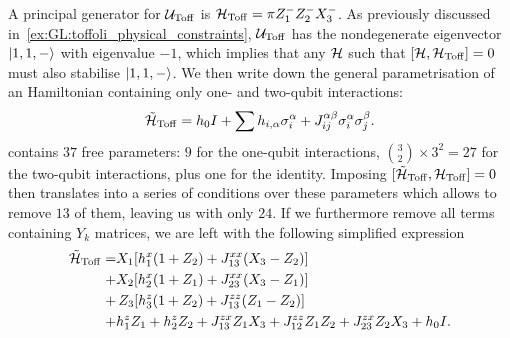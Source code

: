 A principal generator for ${\mathcal{U}}_{\operatorname{Toff}}$ is ${\mathcal{H}}_{\operatorname{Toff}}=\pi Z_1^- Z_2^- X_3^-$.
As previously discussed in~\cref{ex:GL:toffoli_physical_constraints}, ${\mathcal{U}}_{\operatorname{Toff}}$ has the nondegenerate eigenvector $\ket{1,1,-}$ with eigenvalue $-1$, which implies that any ${\mathcal{H}}$ such that $[{\mathcal{H}},{\mathcal{H}}_{\operatorname{Toff}}]=0$ must also stabilise $\ket{1,1,-}$.
We then write down the general parametrisation of an Hamiltonian containing only one- and two-qubit interactions:
\begin{equation}
    \tilde{{\mathcal{H}}}_{\operatorname{Toff}} =
    h_0 I + \sum h_{i,\alpha}\sigma_i^\alpha
    + J_{ij}^{\alpha\beta}\sigma_i^\alpha\sigma_j^\beta.
    \label{eq:GL:general_toffoli_onetwoqubitints}
\end{equation}
 contains $37$ free parameters: $9$ for the one-qubit interactions, $\binom{3}{2}\times 3^2=27$ for the two-qubit interactions, plus one for the identity.
Imposing $[\tilde{{\mathcal{H}}}_{\operatorname{Toff}},{\mathcal{H}}_{\operatorname{Toff}}]=0$ then translates into a series of conditions over these parameters which allows to remove $13$ of them, leaving us with only $24$.
If we furthermore remove all terms containing $Y_k$ matrices, we are left with the following simplified expression
\begin{equation}
\begin{aligned}
    \tilde{{\mathcal{H}}}_{\operatorname{Toff}} =
    & X_1 [h_1^x (1 + Z_2) + J_{13}^{xx} (X_3 - Z_2)] \\
    +&X_2 [h_2^x (1 + Z_1) + J_{23}^{xx} (X_3 - Z_1)] \\
    +&\,Z_3 [h_3^z(1 + Z_2) + J_{13}^{zz} (Z_1 - Z_2)] \\
    + &h_1^z Z_1 + h_2^z Z_2
    + J_{13}^{zx} Z_1 X_3 + J_{12}^{zz} Z_1 Z_2 + J_{23}^{zx} Z_2 X_3
    +h_0 I.
    \label{eq:GL:general_toffoli_onetwoqubitints_without_Ys}
\end{aligned}
\end{equation}
